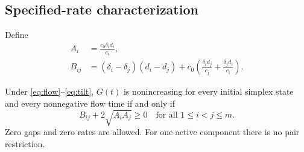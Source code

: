 \subsection{Specified-rate characterization}
Define
\begin{align}
A_i&=\frac{c_0\delta_i d_i}{c_i},\label{eq:A}\\
B_{ij}&=(\delta_i-\delta_j)(d_i-d_j)
+c_0\left(\frac{\delta_i d_j}{c_j}
+\frac{\delta_j d_i}{c_i}\right).\label{eq:B}
\end{align}
\begin{samepage}
\begin{theorem}\label{thm:fixed}
Under \eqref{eq:flow}--\eqref{eq:tilt}, $G(t)$ is nonincreasing for every initial simplex state and every nonnegative flow time if and only if
\begin{equation}\label{eq:criterion}
B_{ij}+2\sqrt{A_iA_j}\ge0
\quad\text{for all }1\le i<j\le m.
\end{equation}
Zero gaps and zero rates are allowed. For one active component there is no pair restriction.
\end{theorem}
\end{samepage}
